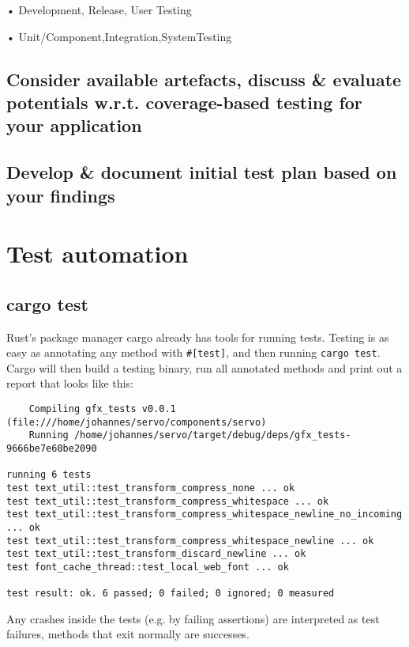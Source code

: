 \documentclass{scrartcl}
\begin{document}
• Development, Release, User Testing

• Unit/Component,Integration,SystemTesting

\subsection{Consider available artefacts, discuss \& evaluate potentials w.r.t. coverage-based testing for your application}

\subsection{Develop \& document initial test plan based on your findings}





\newpage



\section{Test automation}


\subsection{cargo test}

Rust's package manager cargo already has tools for running tests. Testing is as easy as annotating any method with \texttt{\#[test]}, and then running \texttt{cargo test}. Cargo will then build a testing binary, run all annotated methods and print out a report that looks like this:


\begin{verbatim}
    Compiling gfx_tests v0.0.1 (file:///home/johannes/servo/components/servo)
    Running /home/johannes/servo/target/debug/deps/gfx_tests-9666be7e60be2090

running 6 tests
test text_util::test_transform_compress_none ... ok
test text_util::test_transform_compress_whitespace ... ok
test text_util::test_transform_compress_whitespace_newline_no_incoming ... ok
test text_util::test_transform_compress_whitespace_newline ... ok
test text_util::test_transform_discard_newline ... ok
test font_cache_thread::test_local_web_font ... ok

test result: ok. 6 passed; 0 failed; 0 ignored; 0 measured

\end{verbatim}

Any crashes inside the tests (e.g. by failing assertions) are interpreted as test failures, methods that exit normally are successes.
\end{document}
